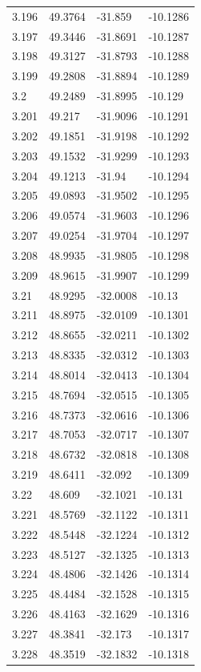 \begin{tabular}{llll}
3.196 & 49.3764 & -31.859 & -10.1286 \\
3.197 & 49.3446 & -31.8691 & -10.1287 \\
3.198 & 49.3127 & -31.8793 & -10.1288 \\
3.199 & 49.2808 & -31.8894 & -10.1289 \\
3.2 & 49.2489 & -31.8995 & -10.129 \\
3.201 & 49.217 & -31.9096 & -10.1291 \\
3.202 & 49.1851 & -31.9198 & -10.1292 \\
3.203 & 49.1532 & -31.9299 & -10.1293 \\
3.204 & 49.1213 & -31.94 & -10.1294 \\
3.205 & 49.0893 & -31.9502 & -10.1295 \\
3.206 & 49.0574 & -31.9603 & -10.1296 \\
3.207 & 49.0254 & -31.9704 & -10.1297 \\
3.208 & 48.9935 & -31.9805 & -10.1298 \\
3.209 & 48.9615 & -31.9907 & -10.1299 \\
3.21 & 48.9295 & -32.0008 & -10.13 \\
3.211 & 48.8975 & -32.0109 & -10.1301 \\
3.212 & 48.8655 & -32.0211 & -10.1302 \\
3.213 & 48.8335 & -32.0312 & -10.1303 \\
3.214 & 48.8014 & -32.0413 & -10.1304 \\
3.215 & 48.7694 & -32.0515 & -10.1305 \\
3.216 & 48.7373 & -32.0616 & -10.1306 \\
3.217 & 48.7053 & -32.0717 & -10.1307 \\
3.218 & 48.6732 & -32.0818 & -10.1308 \\
3.219 & 48.6411 & -32.092 & -10.1309 \\
3.22 & 48.609 & -32.1021 & -10.131 \\
3.221 & 48.5769 & -32.1122 & -10.1311 \\
3.222 & 48.5448 & -32.1224 & -10.1312 \\
3.223 & 48.5127 & -32.1325 & -10.1313 \\
3.224 & 48.4806 & -32.1426 & -10.1314 \\
3.225 & 48.4484 & -32.1528 & -10.1315 \\
3.226 & 48.4163 & -32.1629 & -10.1316 \\
3.227 & 48.3841 & -32.173 & -10.1317 \\
3.228 & 48.3519 & -32.1832 & -10.1318 \\

\end{tabular}
